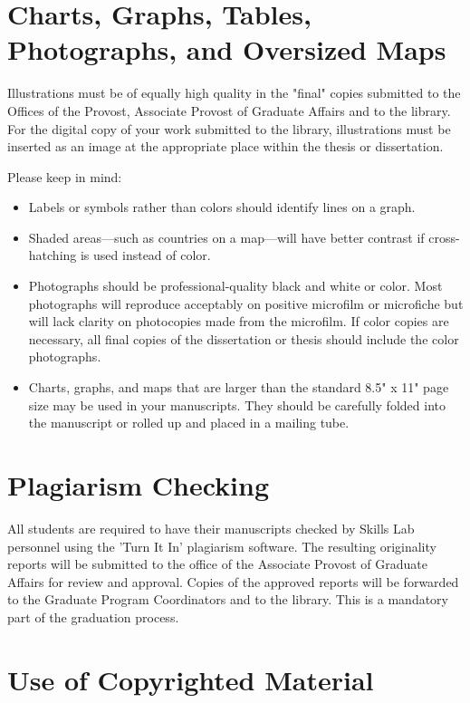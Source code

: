 \section{Charts, Graphs, Tables, Photographs, and Oversized Maps}

Illustrations must be of equally high quality in the "final" copies submitted to the Offices of the Provost, Associate Provost of Graduate Affairs and to the library. For the digital copy of your work submitted to the library, illustrations must be inserted as an image at the appropriate place within the thesis or dissertation.

Please keep in mind:

\begin{itemize}
\item Labels or symbols rather than colors should identify lines on a graph.
\item	Shaded areas---such as countries on a map---will have better contrast if cross-hatching is used instead of color. 
\item	Photographs should be professional-quality black and white or color.  Most photographs will reproduce acceptably on positive microfilm or microfiche but will lack clarity on photocopies made from the microfilm.  If color copies are necessary, all final copies of the dissertation or thesis should include the color photographs.  
\item	Charts, graphs, and maps that are larger than the standard 8.5" x 11" page size may be used in your manuscripts.  They should be carefully folded into the manuscript or rolled up and placed in a mailing tube.

\end{itemize}

\section{Plagiarism Checking}

All students are required to have their manuscripts checked by Skills Lab personnel using the 'Turn It In' plagiarism software. The resulting originality reports will be submitted to the office of the Associate Provost of Graduate Affairs for review and approval.  Copies of the approved reports will be forwarded to the Graduate Program Coordinators and to the library.  This is a mandatory part of the graduation process.

\section{Use of Copyrighted Material}

